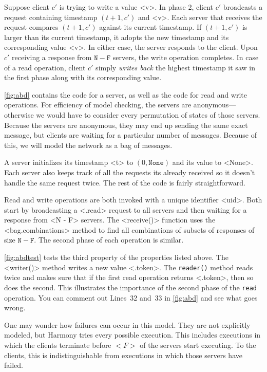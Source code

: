 \documentclass{report}
\begin{document}
Suppose client $c'$ is trying to write a value <{v}>.
In phase 2, client $c'$ broadcasts a request containing timestamp $(t+1, c')$
and <{v}>.  Each server that receives the request compares $(t+1, c')$ against
its current timestamp.  If $(t+1, c')$ is larger than its current timestamp,
it adopts the new timestamp and its corresponding value <{v}>.  In either case,
the server responds to the client.
Upon $c'$ receiving a response from $\mathtt{N} - \mathtt{F}$ servers,
the write operation completes.
In case of a read operation, client $c'$ simply \emph{writes back} the
highest timestamp it saw in the first phase along with its corresponding value.

\autoref{fig:abd} contains the code for a server, as well as the code
for read and write operations.
For efficiency of model checking, the servers are anonymous---otherwise
we would have to consider every permutation of states of those servers.
Because the servers are anonymous, they may end up sending the same
exact message, but clients are waiting for a particular number of
messages.
Because of this, we will model the network as a bag of messages.

A server initializes its timestamp <{t}> to
$(0, \mathtt{None})$ and its value to <{None}>.
Each server also keeps track of all the requests its already received
so it doesn't handle the same request twice.
The rest of the code is fairly straightforward.

Read and write operations are both invoked with a unique identifier
<{uid}>.  Both start by broadcasting a <{.read}>
request to all servers and then waiting for a response from
<{N - F}> servers.
The <{receive()}> function uses the <{bag.combinations}> method
to find all combinations of subsets of responses of size
$\mathtt{N} - \mathtt{F}$.
The second phase of each operation is similar.

\autoref{fig:abdtest} tests the third property of the properties listed
above.  The <{writer()}> method writes a new value <{.token}>.
The \texttt{reader()} method reads twice and makes sure that if the
first read operation returns <{.token}>, then so does the second.
This illustrates the importance of the second phase of the \texttt{read}
operation.  You can comment out Lines~32 and~33 in \autoref{fig:abd} and
see what goes wrong.

One may wonder how failures can occur in this model.  They are not
explicitly modeled, but Harmony tries every possible execution.
This includes executions in which the clients terminate before
$<{F}>$ of the servers start executing.  To the clients, this
is indistinguishable from executions in which those
servers have failed.
\end{document}
